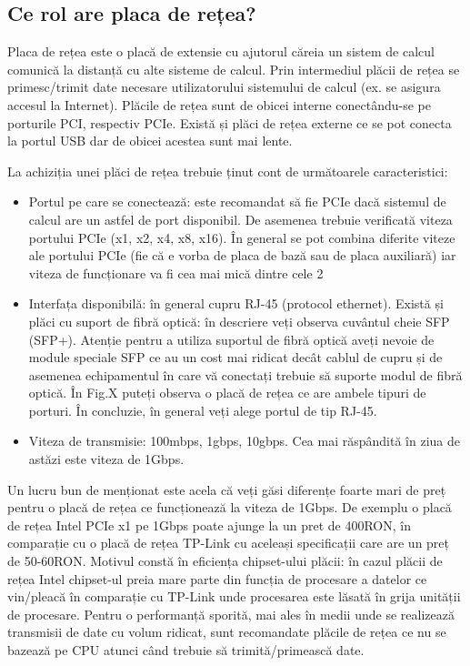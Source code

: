 \subsection{Ce rol are placa de rețea?}
\label{sec:hardware-extensii-net}

Placa de rețea este o placă de extensie cu ajutorul căreia un sistem de calcul
comunică la distanță cu alte sisteme de calcul. Prin intermediul plăcii de rețea
se primesc/trimit date necesare utilizatorului sistemului de calcul (ex. se
asigura accesul la Internet). Plăcile de rețea sunt de obicei interne
conectându-se pe porturile PCI, respectiv PCIe. Există și plăci de rețea externe
ce se pot conecta la portul USB dar de obicei acestea sunt mai lente.


La achiziția unei plăci de rețea trebuie ținut cont de următoarele caracteristici:

\begin{itemize}
	\item Portul pe care se conectează: este recomandat să fie PCIe dacă
		sistemul de calcul are un astfel de port disponibil. De asemenea
		trebuie verificată viteza portului PCIe (x1, x2, x4, x8, x16).
		În general se pot combina diferite viteze ale portului PCIe (fie
		că e vorba de placa de bază sau de placa auxiliară) iar viteza
		de funcționare va fi cea mai mică dintre cele 2
	\item Interfața disponibilă: în general cupru RJ-45 (protocol ethernet).
		Există și plăci cu suport de fibră optică: în descriere veți
		observa cuvântul cheie SFP  (SFP+). Atenție pentru a utiliza
		suportul de fibră optică aveți nevoie de module speciale SFP ce
		au un cost mai ridicat decât cablul de cupru și de asemenea
		echipamentul în care vă conectați trebuie să suporte modul de
		fibră optică. În Fig.X puteți observa o placă de rețea ce are
		ambele tipuri de porturi. În concluzie, în general veți alege
		portul de tip RJ-45.
	\item Viteza de transmisie: 100mbps, 1gbps, 10gbps. Cea mai răspândită
		în ziua de astăzi este viteza de 1Gbps.
\end{itemize}


Un lucru bun de menționat este acela că veți găsi diferențe foarte mari de preț
pentru o placă de rețea ce funcționează la viteza de 1Gbps. De exemplu o placă
de rețea Intel PCIe x1 pe 1Gbps poate ajunge la un pret de 400RON, în comparație
cu o placă de rețea TP-Link cu aceleași specificații care are un preț de
50-60RON. Motivul constă în eficiența chipset-ului plăcii: în cazul plăcii de
rețea Intel chipset-ul preia mare parte din funcția de procesare a datelor ce
vin/pleacă în comparație cu TP-Link unde procesarea este lăsată în grija
unității de procesare. Pentru o performanță sporită, mai ales în medii unde se
realizează transmisii de date cu volum ridicat, sunt recomandate plăcile de
rețea ce nu se bazează pe CPU atunci când trebuie să trimită/primească date.


